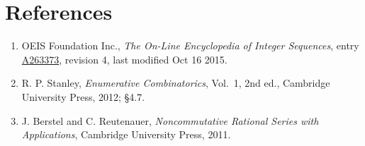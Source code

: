 \documentclass[11pt]{article}
\theoremstyle{definition}
\begin{document}
\section{References}

\begin{enumerate}

\item OEIS Foundation Inc., \emph{The On-Line Encyclopedia of Integer Sequences}, entry \href{https://oeis.org/A263373}{A263373}, revision 4, last modified Oct 16 2015.

\item R. P. Stanley, \emph{Enumerative Combinatorics}, Vol.~1, 2nd ed., Cambridge University Press, 2012; \S4.7.

\item J. Berstel and C. Reutenauer, \emph{Noncommutative Rational Series with Applications}, Cambridge University Press, 2011.

\end{enumerate}
\end{document}
